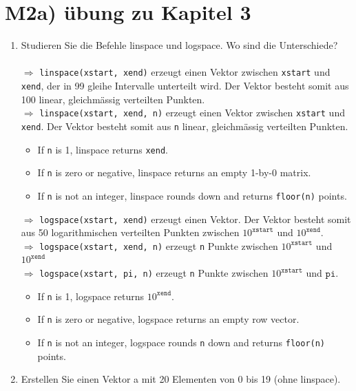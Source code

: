 \section{M2a) übung zu Kapitel 3}
\begin{enumerate}[$(a)$]
\item Studieren Sie die Befehle linspace und logspace. Wo sind die Unterschiede?
\\\\
$\Longrightarrow$ {\color{magenta}\texttt{linspace(xstart, xend)}} erzeugt einen Vektor zwischen \texttt{xstart} und \texttt{xend}, der in 99 gleihe Intervalle unterteilt wird. Der Vektor besteht somit aus 100 linear, gleichmässig verteilten Punkten.
\\
$\Longrightarrow$ {\color{magenta}\texttt{linspace(xstart, xend, n)}} erzeugt einen Vektor zwischen \texttt{xstart} und \texttt{xend}. Der Vektor besteht somit aus \texttt{n} linear, gleichmässig verteilten Punkten.
\begin{itemize}
\item If \texttt{n} is 1, linspace returns \texttt{xend}.
\item If \texttt{n} is zero or negative, linspace returns an empty 1-by-0 matrix.
\item If \texttt{n} is not an integer, linspace rounds down and returns \texttt{floor(n)} points.
\end{itemize}
$\Longrightarrow$ {\color{magenta}\texttt{logspace(xstart, xend)}} erzeugt einen Vektor. Der Vektor besteht somit aus 50 logarithmischen verteilten Punkten zwischen $10^{\texttt{xstart}}$ und $10^{\texttt{xend}}$.
\\
$\Longrightarrow$ {\color{magenta}\texttt{logspace(xstart, xend, n)}} erzeugt \texttt{n} Punkte zwischen $10^{\texttt{xstart}}$ und $10^{\texttt{xend}}$
\\
$\Longrightarrow$ {\color{magenta}\texttt{logspace(xstart, pi, n)}} erzeugt \texttt{n} Punkte zwischen $10^{\texttt{xstart}}$ und $\texttt{pi}$.
\begin{itemize}
\item If \texttt{n} is 1, logspace returns $10^{\texttt{xend}}$.
\item If \texttt{n} is zero or negative, logspace returns an empty row vector.
\item If \texttt{n} is not an integer, logspace rounds \texttt{n} down and returns \texttt{floor(n)} points.
\end{itemize}
\item Erstellen Sie einen Vektor a mit 20 Elementen von 0 bis 19 (ohne linspace).

\end{enumerate}
